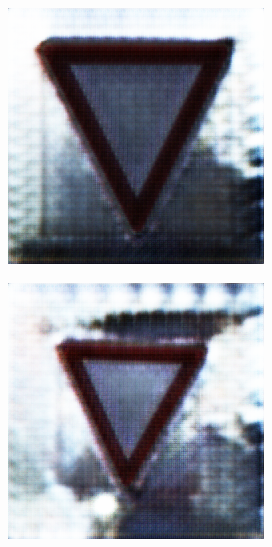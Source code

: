 \documentclass{scrartcl}
\begin{document}
\begin{figure}[h]
	\centering
	\begin{subfigure}[b]{0.13\textwidth}
		\centering
		\includegraphics[height=\textwidth]{./images/generierteBilder/0f1c3406-6040-4a1c-8c2f-10b29515b3c3.png}
		\caption{}
		\label{fig:gtrsb-paper-bsp-image-1}
	\end{subfigure}
	\hspace{2em}%
	\begin{subfigure}[b]{0.13\textwidth}
		\centering
		\includegraphics[height=\textwidth]{./images/generierteBilder/02095bc9-6920-425f-9f5b-5e02dbfda540.png}

\end{subfigure}
\end{figure}
\end{document}

